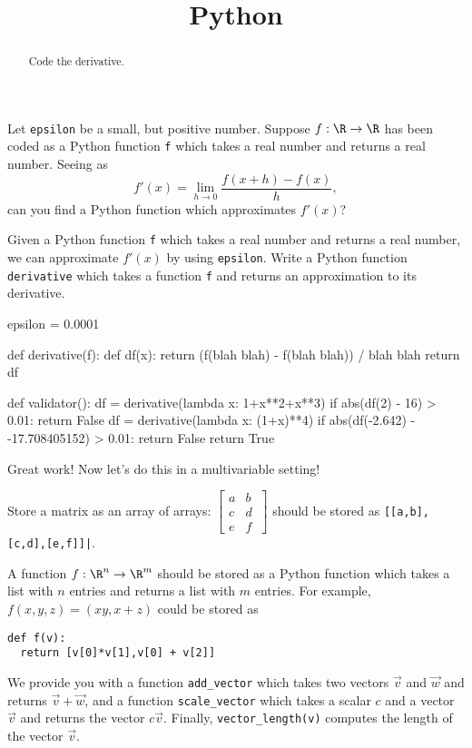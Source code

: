 \documentclass{ximera}
\title{Python}
\begin{document}
\begin{abstract}
  Code the derivative.	
\end{abstract}

\begin{exercise}
  Let \texttt{epsilon} be a small, but positive number.  Suppose $f:\R
  \to \R$ has been coded as a Python function \texttt{f} which takes a
  real number and returns a real number.  Seeing as
  $$
  f'(x) = \lim_{h \to 0} \frac{f(x+h) - f(x)}{h},
  $$
  can you find a Python function which approximates $f'(x)$?

  Given a Python function \texttt{f} which takes a real number and
  returns a real number, we can approximate $f'(x)$ by using
  \texttt{epsilon}.  Write a Python function \texttt{derivative} which
  takes a function \texttt{f} and returns an approximation to its
  derivative.

\begin{solution}
\begin{python}
epsilon = 0.0001


def derivative(f):
  def df(x): return (f(blah blah) - f(blah blah)) / blah blah
  return df


def validator():
  df = derivative(lambda x: 1+x**2+x**3)
  if abs(df(2) - 16) > 0.01:
    return False
  df = derivative(lambda x: (1+x)**4)
  if abs(df(-2.642) - -17.708405152) > 0.01:
    return False
  return True
\end{python}
\end{solution}

  Great work!  Now let's do this in a multivariable setting!

  Store a matrix as an array of arrays: $\begin{bmatrix} a&b\\c&d\\e&f\ \end{bmatrix}$ should be stored as
  \texttt{[[a,b],[c,d],[e,f]]|}.

  A function $f:\R^n \to \R^m$ should be stored as a Python function
  which takes a list with $n$ entries and returns a list with $m$
  entries.  For example, $f(x,y,z) = (xy,x+z)$ could be stored as
  \begin{verbatim}
def f(v):
  return [v[0]*v[1],v[0] + v[2]]
\end{verbatim}
	
  We provide you with a function \texttt{add\_vector} which takes two
  vectors $\vec{v}$ and $\vec{w}$ and returns $\vec{v}+\vec{w}$, and a
  function \texttt{scale\_vector} which takes a scalar $c$ and a
  vector $\vec{v}$ and returns the vector $c\vec{v}$.  Finally,
  \texttt{vector\_length(v)} computes the length of the vector
  $\vec{v}$.


\end{exercise}
\end{document}

